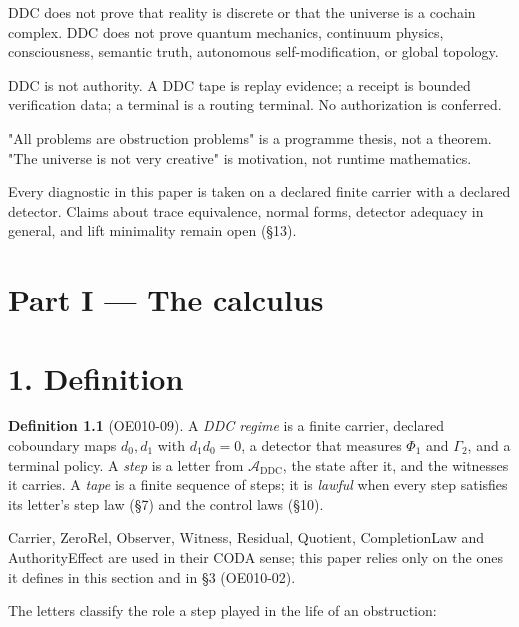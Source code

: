 \documentclass[
  11pt,
]{article}
\newenvironment{Shaded}{}{}
\newcommand{\NormalTok}[1]{#1}
\renewcommand{\_}{\ddcunderscore\allowbreak}
\begin{document}
\begin{Shaded}
\begin{Highlighting}[]
\NormalTok{DDC does not prove that reality is discrete or that the universe is a cochain complex.}
\NormalTok{DDC does not prove quantum mechanics, continuum physics, consciousness, semantic truth,}
\NormalTok{autonomous self{-}modification, or global topology.}

\NormalTok{DDC is not authority. A DDC tape is replay evidence; a receipt is bounded verification}
\NormalTok{data; a terminal is a routing terminal. No authorization is conferred.}

\NormalTok{"All problems are obstruction problems" is a programme thesis, not a theorem.}
\NormalTok{"The universe is not very creative" is motivation, not runtime mathematics.}
\end{Highlighting}
\end{Shaded}

Every diagnostic in this paper is taken on a declared finite carrier
with a declared detector. Claims about trace equivalence, normal forms,
detector adequacy in general, and lift minimality remain open (§13).

\section{Part I --- The calculus}\label{part-i-the-calculus}

\section{1. Definition}\label{definition}

\textbf{Definition 1.1} (OE010-09). A \emph{DDC regime} is a finite
carrier, declared coboundary maps \(d_0, d_1\) with \(d_1 d_0 = 0\), a
detector that measures \(\Phi_1\) and \(\Gamma_2\), and a terminal
policy. A \emph{step} is a letter from \(\mathcal{A}_{\mathrm{DDC}}\),
the state after it, and the witnesses it carries. A \emph{tape} is a
finite sequence of steps; it is \emph{lawful} when every step satisfies
its letter's step law (§7) and the control laws (§10).

Carrier, ZeroRel, Observer, Witness, Residual, Quotient, CompletionLaw
and AuthorityEffect are used in their CODA sense; this paper relies only
on the ones it defines in this section and in §3 (OE010-02).

The letters classify the role a step played in the life of an
obstruction:
\end{document}
